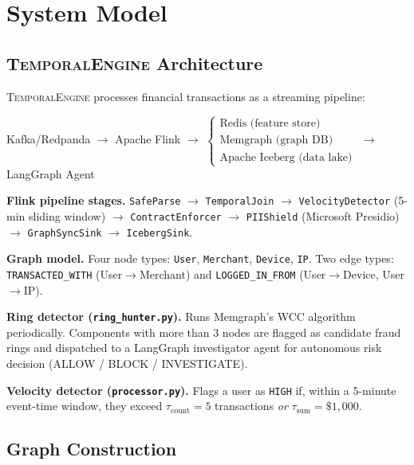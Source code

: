 \documentclass[sigconf,nonacm]{acmart}
\newcommand{\sysname}{\textsc{TemporalEngine}\xspace}
\newcommand{\wcc}{\textsc{WCC}\xspace}
\begin{document}
\section{System Model}

\subsection{\sysname Architecture}

\sysname processes financial transactions as a streaming pipeline:

\begin{center}
\small
Kafka/Redpanda $\to$ Apache Flink $\to$
$\begin{cases}
  \text{Redis (feature store)}\\
  \text{Memgraph (graph DB)}\\
  \text{Apache Iceberg (data lake)}
\end{cases}$
$\to$ LangGraph Agent
\end{center}

\noindent\textbf{Flink pipeline stages.}
\texttt{SafeParse} $\to$ \texttt{TemporalJoin} $\to$ \texttt{VelocityDetector}
(5-min sliding window) $\to$ \texttt{ContractEnforcer} $\to$ \texttt{PIIShield}
(Microsoft Presidio) $\to$ \texttt{GraphSyncSink} $\to$ \texttt{IcebergSink}.

\noindent\textbf{Graph model.}
Four node types: \texttt{User}, \texttt{Merchant}, \texttt{Device}, \texttt{IP}.
Two edge types: \texttt{TRANSACTED\_WITH} (User$\to$Merchant) and
\texttt{LOGGED\_IN\_FROM} (User$\to$Device, User$\to$IP).

\noindent\textbf{Ring detector (\texttt{ring\_hunter.py}).}
Runs Memgraph's \wcc algorithm periodically.  Components with more than 3
nodes are flagged as candidate fraud rings and dispatched to a LangGraph
investigator agent for autonomous risk decision (ALLOW / BLOCK / INVESTIGATE).

\noindent\textbf{Velocity detector (\texttt{processor.py}).}
Flags a user as \texttt{HIGH} if, within a 5-minute event-time window, they
exceed $\tau_{\mathrm{count}} = 5$ transactions \emph{or} $\tau_{\mathrm{sum}}
= \$1{,}000$.

\subsection{Graph Construction}
\end{document}

